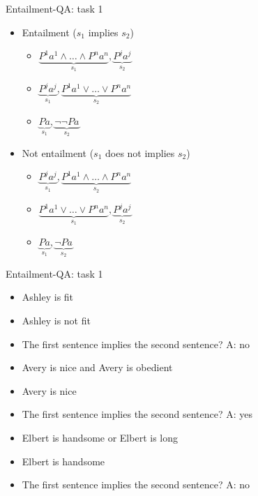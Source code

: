 \documentclass[10pt]{beamer}
\begin{document}
\begin{frame}{Entailment-QA: task 1}
\begin{itemize}
\item \alert{Entailment} ($s_1$ implies $s_2$)
\begin{itemize}
\item $\underbrace{P^{1}a^1 \land \dots \land P^{n}a^n}_{s_1}, \underbrace{P^{j}a^j}_{s_2}$ 
\item $\underbrace{P^{j}a^j}_{s_1}, \underbrace{P^{1}a^1 \lor \dots \lor P^{n}a^n}_{s_2}$
\item $\underbrace{Pa}_{s_1}, \underbrace{\lnot \lnot Pa}_{s_2}$
\end{itemize}

\vspace{0.4cm}
\item \alert{Not entailment} ($s_1$ does not implies $s_2$)
\begin{itemize}
\item $\underbrace{P^{j}a^j}_{s_1}, \underbrace{P^{1}a^1 \land \dots \land P^{n}a^n}_{s_2}$ 
\item $\underbrace{P^{1}a^1 \lor \dots \lor P^{n}a^n}_{s_1}, \underbrace{P^{j}a^j}_{s_2}$
\item $\underbrace{Pa}_{s_1}, \underbrace{\lnot Pa}_{s_2}$
\end{itemize}
\end{itemize}
\end{frame}


\begin{frame}{Entailment-QA: task 1}
\begin{itemize} 
\item[] Ashley is fit
\item[] Ashley is not fit
\item[] The first sentence implies the second sentence? \alert{A: no}
\end{itemize}

\vspace{0.3cm}


\begin{itemize} 
\item[]Avery is nice and Avery is obedient
\item[]Avery is nice
\item[]The first sentence implies the second sentence? \alert{A: yes}
\end{itemize}

\vspace{0.3cm}

\begin{itemize} 
\item[]Elbert is handsome or Elbert is long
\item[]Elbert is handsome
\item[]The first sentence implies the second sentence? \alert{A: no}
\end{itemize}
\end{frame}
\end{document}
